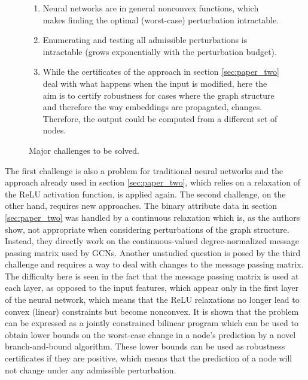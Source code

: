 \documentclass[a4paper,preprint]{sig-alternate}
\begin{document}
\begin{figure}[h]
    \centering
    \begin{enumerate}
        \item Neural networks are in general nonconvex functions, which makes finding the optimal (worst-case)
        perturbation intractable.
        \item Enumerating and testing all admissible perturbations is intractable (grows exponentially with the perturbation budget).
        \item While the certificates of the approach in section \ref{sec:paper_two} deal with what happens when the input is modified, here the
        aim is to certify robustness for cases where the graph structure and therefore the way embeddings are propagated, changes.
        Therefore, the output could be computed from a different set of nodes.
    \end{enumerate}
    \caption{Major challenges to be solved.}
    \label{fig:challenges}
\end{figure}

The first challenge is also a problem for traditional neural networks and the approach already used
in section \ref{sec:paper_two}, which relies on a relaxation of the ReLU activation function, is applied again.
The second challenge, on the other hand, requires new approaches. 
The binary attribute data in section \ref{sec:paper_two} was handled by a continuous relaxation which is, as the authors show,
not appropriate when considering perturbations of the graph structure. Instead, they directly work on the 
continuous-valued degree-normalized message passing matrix used by GCNs.
Another unstudied question is posed by the third challenge and requires a way to deal with changes to the message passing matrix.
The difficulty here is seen in the fact that the message passing matrix is used at each layer, as opposed to the input features,
which appear only in the first layer of the neural network, which means that the ReLU relaxations no longer lead to convex (linear)
constraints but become nonconvex. It is shown that the problem can be expressed as a jointly constrained bilinear program
which can be used to obtain lower bounds on the worst-case change in a node's prediction by a novel branch-and-bound algorithm.
These lower bounds can be used as robustness certificates if they are positive, which means that the prediction of a node will not
change under any admissible perturbation.

\vfill
\pagebreak
\end{document}
